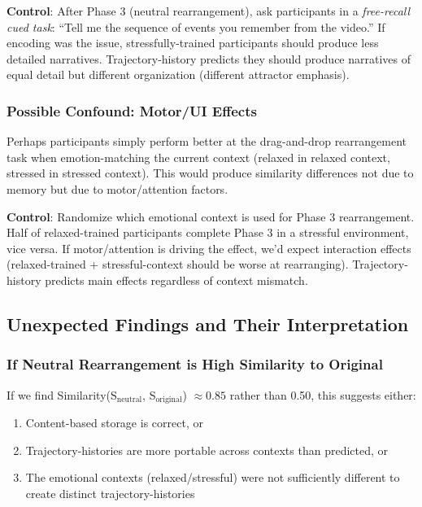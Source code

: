 \documentclass[12pt,a4paper]{article}
\theoremstyle{definition}
\begin{document}
\textbf{Control}: After Phase 3 (neutral rearrangement), ask participants in a \textit{free-recall cued task}: ``Tell me the sequence of events you remember from the video.'' If encoding was the issue, stressfully-trained participants should produce less detailed narratives. Trajectory-history predicts they should produce narratives of equal detail but different organization (different attractor emphasis).

\subsubsection{Possible Confound: Motor/UI Effects}

Perhaps participants simply perform better at the drag-and-drop rearrangement task when emotion-matching the current context (relaxed in relaxed context, stressed in stressed context). This would produce similarity differences not due to memory but due to motor/attention factors.

\textbf{Control}: Randomize which emotional context is used for Phase 3 rearrangement. Half of relaxed-trained participants complete Phase 3 in a stressful environment, vice versa. If motor/attention is driving the effect, we'd expect interaction effects (relaxed-trained + stressful-context should be worse at rearranging). Trajectory-history predicts main effects regardless of context mismatch.

\subsection{Unexpected Findings and Their Interpretation}

\subsubsection{If Neutral Rearrangement is High Similarity to Original}

If we find Similarity(S$_{\text{neutral}}$, S$_{\text{original}}$) $\approx 0.85$ rather than 0.50, this suggests either:

\begin{enumerate}
  \item Content-based storage is correct, or
  \item Trajectory-histories are more portable across contexts than predicted, or
  \item The emotional contexts (relaxed/stressful) were not sufficiently different to create distinct trajectory-histories
\end{enumerate}
\end{document}
